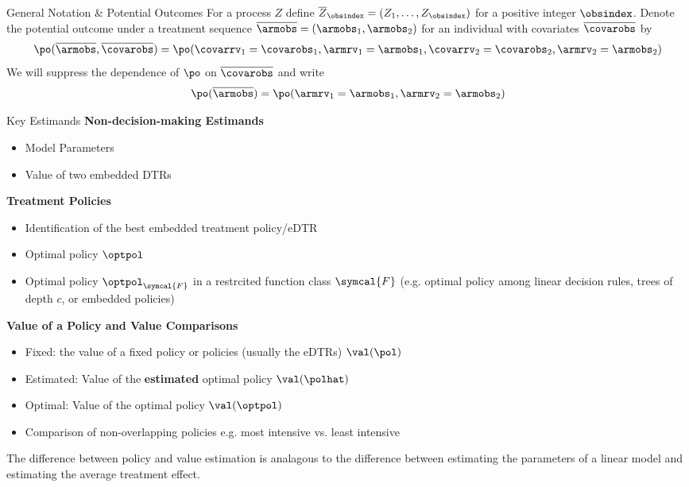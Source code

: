 %

\begin{frame}{General Notation \& Potential Outcomes}
	\vfill
	For a process $Z$ define $\overline{Z}_{\obsindex} = (Z_1, \ldots, Z_{\obsindex})$
	for a positive integer $\obsindex$.
	\pause \vfill
	Denote the potential outcome under a treatment sequence $\overline{\armobs} =
		(\armobs_1, \armobs_2)$ for an individual with covariates $\overline{\covarobs}$  by
	$$\po(\overline{\armobs}, \overline{\covarobs}) = \po(\covarrv_1 = \covarobs_1, \armrv_1 = \armobs_1, \covarrv_2 = \covarobs_2,\armrv_{2} = \armobs_{2})$$
	\pause \vfill
	We will suppress the dependence of $\po$ on $\overline{\covarobs}$ and write
	$$\po(\overline{\armobs}) = \po(\armrv_1 = \armobs_1, \armrv_{2} = \armobs_{2})$$
\end{frame}



\begin{frame}{Key Estimands}
	\textbf{Non-decision-making Estimands}
	\begin{itemize}
		\item Model Parameters
	\end{itemize}
	\vfill \pause

	\begin{itemize}
		\item Value of two embedded DTRs
	\end{itemize}

	\textbf{Treatment Policies}
	\begin{itemize}
		\item Identification of the best embedded treatment policy/eDTR
		\item Optimal policy $\optpol$
		\item Optimal policy $\optpol_{\symcal{F}}$ in a restrcited function
		      class $\symcal{F}$ (e.g. optimal policy among linear decision rules, trees of depth
		      $c$, or embedded policies)
	\end{itemize}
	\vfill \pause

	\textbf{Value of a Policy and Value Comparisons}
	\begin{itemize}
		\item Fixed: the value of a fixed policy or policies (usually the eDTRs) $\val(\pol)$
		\item Estimated: Value of the \textbf{estimated} optimal policy $\val(\polhat)$
		\item Optimal: Value of the optimal policy $\val(\optpol)$
		\item Comparison of non-overlapping policies e.g. most intensive vs. least intensive
	\end{itemize}

	\vfill \pause

	\footnotesize The difference between policy and value estimation is analagous to the
	difference between estimating the parameters of a linear model and estimating
	the average treatment effect.
\end{frame}


